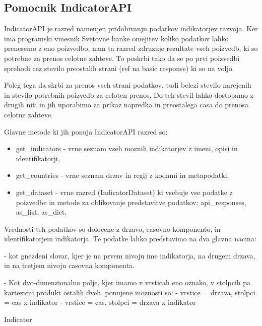 \subsection{Pomocnik IndicatorAPI}

IndicatorAPI je razred namenjen pridobivanju podatkov indikatorjev razvoja.
Ker ima programski vmesnik Svetovne banke omejitev koliko podatkov lahko
prenesemo z eno poizvedbo, nam ta razred zdruzuje rezultate vseh poizvedb, ki
so potrebne za prenos celotne zahteve. To poskrbi tako da se po prvi poizvedbi
sprehodi cez stevilo preostalih strani (ref na basic response) ki so na voljo. 

Poleg tega da skrbi za prenos vseh strani podatkov, tudi belezi stevilo 
narejenih in stevilo potrebnih poizvedb za celoten prenos. Do teh stevil lahko
dostopamo z drugih niti in jih uporabimo za prikaz napredka in preostalega
casa do prenosa celotne zahteve.

Glavne metode ki jih ponuja IndicatorAPI razred so:

\begin{itemize}  
\item get\_indicators - vrne seznam vseh moznih indikatorjev z imeni, opisi in
      identifikatorji,
\item get\_countries - vrne seznam drzav in regij z kodami in metapodatki,
\item get\_dataset - vrne razred (IndicatorDataset) ki vsebuje vse podatke z 
      poizvedbe in metode za oblikovanje predstavitve podatkov: api\_responses,
      as\_list, as\_dict.
\end{itemize}




Vrednosti teh podatkov so dolocene z drzavo, casovno komponento, in
identifikatorjem indikatorja. Te podatke lahko predstavimo na dva glavna nacina:

 - kot gnezdeni slovar, kjer je na prvem nivoju ime indikatorja, na drugem
   drzava, in na tretjem nivoju casovna komponenta.

 - Kot dvo-dimenzionalno polje, kjer imamo v vrsticah eno oznako, v stolpcih
   pa kartezicni produkt ostalih dveh. ponujene moznosti so:
   - vrstice = drzava, stolpci = cas x indikator
   - vrstice = cas, stolpci = drzava x indikator


Indicator



% 
% 
% 
% 
% 
% 




